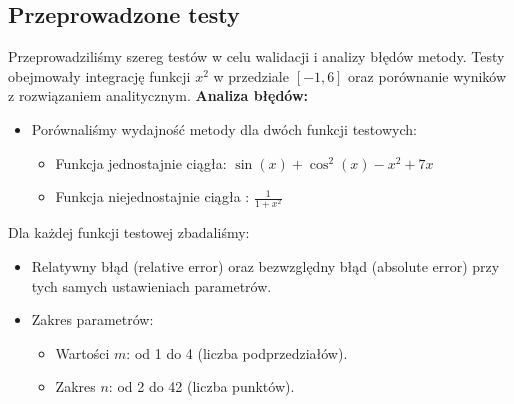 \subsection{Przeprowadzone testy}

Przeprowadziliśmy szereg testów w celu walidacji i analizy błędów metody. Testy obejmowały integrację funkcji \( x^2 \) w przedziale \([-1, 6]\) oraz porównanie wyników z rozwiązaniem analitycznym.
\textbf{Analiza błędów:}
\begin{itemize}
    \item Porównaliśmy wydajność metody dla dwóch funkcji testowych:
    \begin{itemize}
        \item Funkcja jednostajnie ciągła: \( \sin(x) + \cos^2(x) - x^2 + 7x \)
        \item Funkcja niejednostajnie ciągła : \( \frac{1}{1+x^2} \)
    \end{itemize}
\end{itemize}
Dla każdej funkcji testowej zbadaliśmy:
\begin{itemize}
    \item Relatywny błąd (relative error) oraz bezwzględny błąd (absolute error) przy tych samych ustawieniach parametrów.
    \item Zakres parametrów:
    \begin{itemize}
        \item Wartości \( m \): od 1 do 4 (liczba podprzedziałów).
        \item Zakres \( n \): od 2 do 42 (liczba punktów).
    \end{itemize}
\end{itemize}

